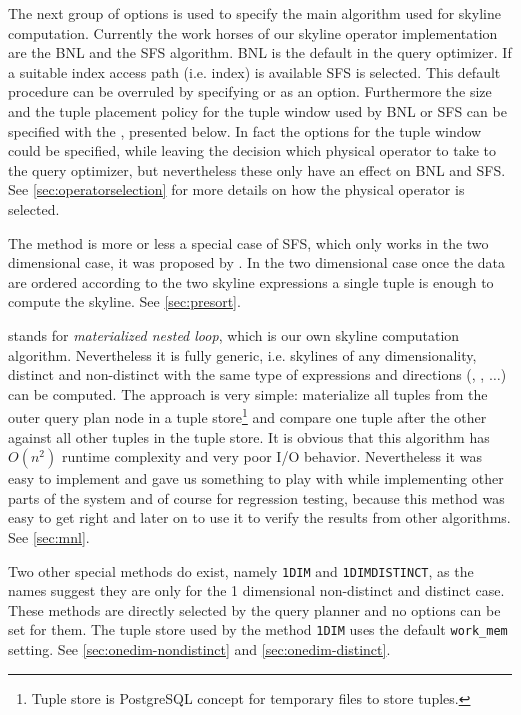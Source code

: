The next group of options is used to specify the main algorithm used for
skyline computation.
%
%
Currently the work horses of our skyline operator implementation
are the BNL and the SFS algorithm. 
BNL is the default in the query optimizer.
If a suitable index access path (i.e. index) is available SFS is
selected.
This default procedure can be overruled by
specifying  or  as an option. Furthermore
the size and the tuple placement policy for the tuple window used by
BNL or SFS can be specified with the , presented below.
In fact the options for the tuple window could be specified, while
leaving the decision which physical operator to take to the query
optimizer, but nevertheless these  only have an
effect on BNL and SFS. See \autoref{sec:operatorselection} for
more details on how the physical operator is selected.


The  method is more or less a special case of SFS,
which only works in the two dimensional case, it was proposed by 
\citet{Borzsonyi2001}. In the two dimensional case once the data
are ordered according to the two skyline expressions a single tuple is
enough to compute the skyline. See \autoref{sec:presort}.

 stands for \emph{materialized nested loop}, which
is our own \naive skyline computation algorithm.
Nevertheless it is fully generic, i.e. skylines of any dimensionality,
distinct and non-distinct with the same type of expressions and
directions (, , $\ldots$) can be
computed. The approach is very simple: materialize all tuples from the
outer query plan node in a tuple store\footnote{Tuple store is PostgreSQL concept for temporary files
to store tuples.} and compare one tuple after the other against all
other tuples in the tuple store. It is obvious that this algorithm has
$O(n^2)$ runtime complexity and very poor I/O behavior. Nevertheless
it was easy to implement and gave us something to play with while
implementing other parts of the system and of course for regression
testing, because this method was easy to get right and later on to
use it to verify the results from other algorithms. See
\autoref{sec:mnl}.

Two other special methods do exist, namely \texttt{1DIM} and
\texttt{1DIMDISTINCT}, as the names suggest they are only for the 1
dimensional non-distinct and distinct case.  These methods are
directly selected by the query planner and no options can be set for
them.  The tuple store used by the method \texttt{1DIM} uses the
default \texttt{work\_mem} setting. See
\autoref{sec:onedim-nondistinct} and
\autoref{sec:onedim-distinct}.

